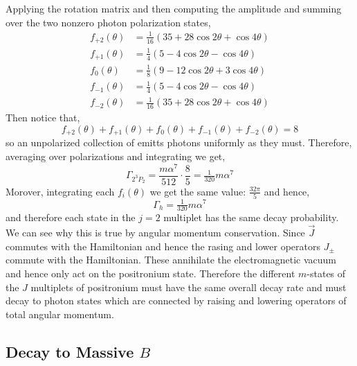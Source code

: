 \documentclass[12pt]{article}
\begin{document}
Applying the rotation matrix and then computing the amplitude and summing over the two nonzero photon polarization states,
\begin{align*}
f_{+2}(\theta) &= \tfrac{1}{16} (35 + 28 \cos{2 \theta} + \cos{4 \theta})
\\
f_{+1}(\theta) &= \tfrac{1}{4} (5 - 4 \cos{2 \theta} - \cos{4 \theta})
\\
f_0(\theta) &= \tfrac{1}{8} (9 - 12 \cos{2 \theta} + 3 \cos{4 \theta})
\\
f_{-1}(\theta) &= \tfrac{1}{4} (5 - 4 \cos{2 \theta} - \cos{4 \theta})
\\
f_{-2}(\theta) &= \tfrac{1}{16} (35 + 28 \cos{2 \theta} + \cos{4 \theta})
\end{align*}
Then notice that,
\[ f_{+2}(\theta) + f_{+1}(\theta) + f_0(\theta) + f_{-1}(\theta) + f_{-2}(\theta) = 8 \]
so an unpolarized collection of emitts photons uniformly as they must. Therefore, averaging over polarizations and integrating we get,
\[ \Gamma_{2^3 P_2} = \frac{m \alpha^7}{512} \cdot \frac{8}{5} = \tfrac{1}{320} m \alpha^7  \]
Morover, integrating each $f_i(\theta)$ we get the same value: $\frac{32 \pi}{5}$ and hence,
\[ \Gamma_h = \tfrac{1}{320} m \alpha^7 \]
and therefore each state in the $j = 2$ multiplet has the same decay probability. We can see why this is true by angular momentum conservation. Since $\vec{J}$ commutes with the Hamiltonian and hence the rasing and lower operators $J_{\pm}$ commute with the Hamiltonian. These annihilate the electromagnetic vacuum and hence only act on the positronium state. Therefore the different $m$-states of the $J$ multiplets of positronium must have the same overall decay rate and must decay to photon states which are connected by raising and lowering operators of total angular momentum.



\subsection{Decay to Massive $B$}
\end{document}
